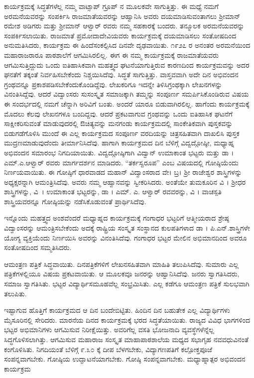 {ಕಾರ್ಯಕ್ರಮಕ್ಕೆ ಸಿದ್ಧತೆಗಳೆಲ್ಲ ನಮ್ಮ ವಾಟ್ಸಾಪ್ ಗ್ರೂಪ್ ನ ಮೂಲಕವೇ ಸಾಗುತ್ತಿತ್ತು. ಈ ಮಧ್ಯೆ ನಮಗೆ ಅರಮನೆಯವರನ್ನು ಸಂಪರ್ಕಿಸಿ ರಾಜಮಾತೆಯವರನ್ನು ಆಹ್ವಾನಿಸಿ ಅವರು ದಯಮಾಡಿಸುವಂತಾಗಲು ಶ್ರೀಮಾನ್ ರಮೇಶ ಅಡಿಗರು ಮತ್ತು ಶ್ರೀಮಾನ್ ಆಳ್ವಾರ್ ರವರು ನಮ್ಮ ಸಹಕಾರಕ್ಕೆ ಬಂದರು. ತನ್ಮೂಲಕ ಅರಮನೆಯವರನ್ನು ಸಂಪರ್ಕಿಸಲಾಯಿತು. ರಾಜಮಾತೆ ಪ್ರಮೋದಾದೇವಿಯವರು ಕಾರ್ಯಕ್ರಮಕ್ಕೆ ದಯಮಾಡಿಸಲು ಸಂತೋಷದಿಂದ ಅನುಮತಿಸಿದರು, ಕಾರ್ಯಕ್ರಮ ಈ ಹಿಂದೆ\break ಸಂಕಲ್ಪಿಸಿದ ದಿನವೇ ದೃಢವಾಯಿತು. ೧೯೨೭ ರ ಅನಂತರ ಅರಮನೆಯಿಂದ ಮಹಾರಾಜರಾರೂ ಪಾಠಶಾಲೆಗೆ ಆಗಮಿಸಿರಲಿಲ್ಲ. ಈಗ ಈ ನಮ್ಮ ಕಾರ್ಯಕ್ರಮಕ್ಕೆ \hbox{ರಾಜಮಾತೆಯವರು} ಆಗಮಿಸುತ್ತಿದ್ದುದು ಒಂದು ಐತಿಹಾಸಿಕವಾಗಿ ಮಹತ್ತ್ವದ ಘಟನೆ\-ಯಾಗುತ್ತಿರುವ ಕಾರಣದಿಂದ ಕಾರ್ಯಕ್ರಮವನ್ನು ಅದರ ಘನತೆಗೆ ತಕ್ಕಂತೆ ನಿರ್ವಹಿಸಬೇಕೆಂದು ನಿಶ್ಚಯಿಸಿದೆವು. ಸಿದ್ಧತೆ ಸಾಗುತ್ತಿತ್ತು. ವಾಸ್ತವವಾಗಿ ಅದೇ ದಿನ ಅಭಿವಂದನ ಗ್ರಂಥವನ್ನೂ ಪ್ರಕಾಶಪಡಿಸಬೇಕೆಂದುಕೊಂಡಿದ್ದೆವು. ಲೇಖಕರಿಗೂ ಇದನ್ನೇ ತಿಳಿಸಿ\break ಗ್ರಂಥಕ್ಕಾಗಿ ಲೇಖನಗಳನ್ನು ವಿನಂತಿಸಿದ್ದೆವು. ಆದರೆ ವಿದ್ವಾಂಸರು ಸುಸಂಸ್ಕೃತ ಸಮಾಜ\-ಕ್ಕಾಗಿ ತಮ್ಮನ್ನು ಸಂಪೂರ್ಣ ಸಮರ್ಪಿಸಿಕೊಂಡಿರುವ ವಿಷಯ ಈ ಸಂದರ್ಭದಲ್ಲಿ ನಮಗೆ ಚೆನ್ನಾಗಿ ಅರಿವಿಗೆ ಬಂತು. ಅಂದರೆ ಯಾರೂ ಬಿಡುವಾಗಿರಲಿಲ್ಲ. ಹಾಗೆಂದು ಕಾರ್ಯಕ್ರಮಕ್ಕೆ ಮೊದಲು ಕೆಲವು ಲೇಖನಗಳೂ ಬಂದಿದ್ದವು. ಆದರೆ ಪ್ರಕಟವಾಗುವ ಗ್ರಂಥವನ್ನು ಒಂದು ಐತಿಹಾಸಿಕ ಘಟನೆಗೆ ಸಾಕ್ಷೀಕರಿಸುವಂತೆ ಮಾಡುವುದರಲ್ಲಿ  ಔಚಿತ್ಯವನ್ನು ಮನಗಂಡು ಕಾರ್ಯಕ್ರಮದಲ್ಲಿ ಸಾಂಕೇತಿಕವಾಗಿ ಪುಸ್ತಕವನ್ನು ಬಿಡುಗಡೆಗೊಳಿಸಿ ಮುಂದೆ ಈ ಎಲ್ಲ ಕಾರ್ಯಕ್ರಮದ ಸಂಪೂರ್ಣ ವರದಿಯನ್ನು ಚಿತ್ರಸಹಿತವಾಗಿ ದಾಖಲಿಸಿ ಪುಸ್ತಕ ಮುದ್ರಣಮಾಡುವುದೆಂದು ತೀರ್ಮಾನಿಸಿದೆವು. ಹಾಗಾಗಿ ಕಾರ್ಯಕ್ರಮದ ದಿನ ಬೆಳಿಗ್ಗೆ ವಿದ್ವದ್ಗೋಷ್ಠೀ, ಮಧ್ಯಾಹ್ನ ಅಭಿವಂದನ ಸಮಾರಂಭ ನಿಗದಿಯಾಯಿತು. ವಿದ್ವದ್ಗೋಷ್ಠಿಗಾಗಿ ವಿದ್ವಾನ್ ಉಮಾಕಾಂತ ಭಟ್ಟರು ಮತ್ತು ಡಾ । ಎಮ್.ಎ.ಆಳ್ವಾರ್ ರವರು ಮಾರ್ಗದರ್ಶನ ಮಾಡಿದರು. “ತರ್ಕಸ್ವರೂಪ” ಎಂಬ ವಿಷಯದಲ್ಲಿ ಗೋಷ್ಠಿಯೆಂದು ನಿರ್ಣಯವಾಯಿತು. ಈ ಗೋಷ್ಠಿಗೆ ಧಾರವಾಡದ ಮಹಾನ್ ವಿದ್ವಾಂಸರಾದ ವೇ। ಬ್ರ। ಶ್ರೀ ರಾಜೇಶ್ವರ ಶಾಸ್ತ್ರಿಗಳನ್ನು ಅಧ್ಯಕ್ಷರನ್ನಾಗಿ ಆಮಂತ್ರಿಸಿದೆವು. ಅವರು ನಮ್ಮ ಆಹ್ವಾನವನ್ನು ಸ್ವೀಕರಿಸಿದರು. ಅಂತೆಯೇ ತುಮಕೂರಿನ ವಿ । ಶ್ರೀಧರ ಶಾಸ್ತ್ರಿಗಳನ್ನು,   ವಿ~। ಉಮಾಕಾಂತ ಭಟ್ಟರನ್ನು, ಡಾ । ಎಮ್. ಎ. ಆಳ್ವಾರ್ ರವವರನ್ನು, ವಿ । ವಾಚಸ್ಪತಿ ಶಾಸ್ತ್ರಿಯವರನ್ನೂ ಗೋಷ್ಠಿಯನ್ನು ನಡೆಸಿಕೊಡುವಂತೆ ಪ್ರಾರ್ಥಿಸಿದೆವು. 
\vskip 8pt

ಇನ್ನೊಂದು ಮಹತ್ತ್ವದ ಅಂಶವೆಂದರೆ ಮಧ್ಯಾಹ್ನದ ಕಾರ್ಯಕ್ರಮಕ್ಕೆ ಗಂಗಾಧರ ಭಟ್ಟರಿಗೆ ಆತ್ಮೀಯರಾದ ಶ್ರೇಷ್ಠ ವಿದ್ವಾಂಸರನ್ನು ಆಮಂತ್ರಿಸಬೇಕೆಂದು ಅದಕ್ಕೆ ರಾಷ್ಟ್ರಿಯ ಸಂಸ್ಕೃತ ಸಂಸ್ಥಾನದ ಕುಲಪತಿಗಳಾದ ಡಾ । ಪಿ.ಎನ್.ಶಾಸ್ತ್ರಿಗಳೇ ಯೋಗ್ಯ ವ್ಯಕ್ತಿಯೆಂದು ನಿರ್ಣಯಿಸಿ ಅವರನ್ನು ವಿನಂತಿಸಿದೆವು. ಗಂಗಾಧರ ಭಟ್ಟರ ಮೇಲಿನ ಅಭಿಮಾನದಿಂದ ಅವರೂ ಸಂತೋಷದಿಂದ ಸಮ್ಮತಿಸಿದರು. 

ಆಮಂತ್ರಣ ಪತ್ರಿಕೆ ಸಿದ್ಧವಾಯಿತು. ದಿನಪತ್ರಿಕೆಗಳಿಗೆ ಲೇಖನಸಹಿತವಾಗಿ ಮಾಹಿತಿ ತಲುಪಿಸಿದೆವು. ಸುಮಾರು ಎಲ್ಲ ಪತ್ರಿಕೆಗಳಲ್ಲಿಯೂ ವಿಷಯ ಪ್ರಕಟವಾಯಿತು. ಆ ಮೂಲಕವೂ ಜನರನ್ನು ಆಹ್ವಾನಿಸಿದೆವು. ಜನರು ಸ್ವಾಗತಿಸಿದರು, ಸಮಾಜ \hbox{ಸ್ವಾಗತಿಸಿತು}. ಭಟ್ಟರ ವಿದ್ಯಾರ್ಥಿಸಮೂಹವೆಲ್ಲ ಸಂಭ್ರಮಿಸಿತು. ಎಲ್ಲ ಕಡೆಗೂ ಆಮಂತ್ರಣ ಪತ್ರಿಕೆ ಸುಲಭವಾಗಿ ತಲುಪಿತು.  

ಇಷ್ಟಾಗುವ ಹೊತ್ತಿಗೆ ಕಾರ್ಯಕ್ರಮದ ಆ ದಿನ ಬಂದೇಬಿಟ್ಟಿತು. ಹಿಂದಿನ ದಿನ ಬಹುತೇಕ ಎಲ್ಲ ವಿದ್ಯಾರ್ಥಿಗಳು ಮೈಸೂರಿನಲ್ಲಿ ಸೇರಿದರು. ಮಾರನೆಯ ದಿನದ ಕಾರ್ಯಕ್ರಮಕ್ಕೆ ಭರದ ಸಿದ್ಧತೆಯಾಯಿತು. ರಾಜ್ಯದ ವಿವಿಧ ಭಾಗಗಳಿಂದ ಭಟ್ಟರ ಅಭಿಮಾನಿಗಳು ಆಗಮಿಸುವ ನಿರೀಕ್ಷೆಯಿತ್ತು. ಅವರಿಗೆಲ್ಲ ವಸತಿ ಭೋಜನಾದಿ ವ್ಯವಸ್ಥೆ\-ಗಳೆನ್ನೆಲ್ಲ ಸಿದ್ಧಗೊಳಿಸಲಾಗಿತ್ತು. ಆಗಮಿಸುವ ಮಹಾರಾಜ ಸಂಸ್ಕೃತ ಮಾಹಾಪಾಠ\-ಶಾಲೆಯ ಮಧ್ಯದ ಸಭಾಗೃಹ ನವವಧುವಿನಂತೆ ಕಂಗೊಳಿಸಿತು. ನಿಗದಿಯಂತೆ ಬೆಳಿಗ್ಗೆ ೯.೩೦ ಕ್ಕೆ ದೀಪ ಬೆಳಗಬೇಕು, ವಿದ್ಯಾಗಣಪತಿಗೆ ಕಲ್ಪೋಕ್ತಪೂಜೆ ಸಂಪನ್ನವಾಗಬೇಕು. ಗೋಷ್ಠಿಯ ಉದ್ಘಾಟನೆಯಾಗಬೇಕು. ಗೋಷ್ಠಿ ಸಂಪನ್ನವಾಗಬೇಕು. ಮಧ್ಯಾಹ್ನಾತ್ಪರ ಅಭಿವಂದನ ಕಾರ್ಯಕ್ರಮ

}

